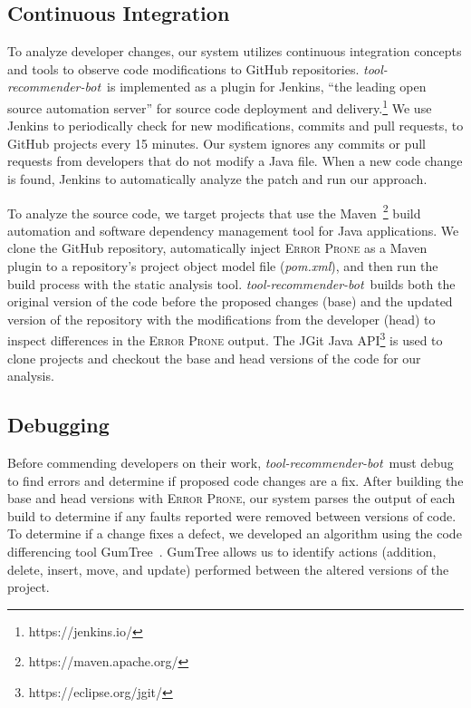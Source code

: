 \documentclass[sigconf,review,anonymous]{acmart}
\newcommand{\tool}{\textsl{tool-recommender-bot}}
\begin{document}
\subsection{Continuous Integration}

To analyze developer changes, our system utilizes continuous integration concepts and tools to observe code modifications to GitHub repositories. \tool~is implemented as a plugin for Jenkins, ``the leading open source automation server'' for source code deployment and delivery.\footnote{https://jenkins.io/} We use Jenkins to periodically check for new modifications, commits and pull requests, to GitHub projects every 15 minutes. Our system ignores any commits or pull requests from developers that do not modify a Java file.
When a new code change is found, Jenkins to automatically analyze the patch and run our approach. 

To analyze the source code, we target projects that use the Maven~\footnote{https://maven.apache.org/} build automation and software dependency management tool for Java applications. We clone the GitHub repository, automatically inject \textsc{Error Prone} as a Maven plugin to a repository's project object model file (\textit{pom.xml}), and then run the build process with the static analysis tool. \tool~builds both the original version of the code before the proposed changes (base) and the updated version of the repository with the modifications from the developer (head) to inspect differences in the \textsc{Error Prone} output. The JGit Java API\footnote{https://eclipse.org/jgit/} is used to clone projects and checkout the base and head versions of the code for our analysis.

\subsection{Debugging}

Before commending developers on their work, \tool~must debug to find errors and determine if proposed code changes are a fix. After building the base and head versions with \textsc{Error Prone}, our system parses the output of each build to determine if any faults reported were removed between versions of code. To determine if a change fixes a defect, we developed an algorithm using the code differencing tool GumTree~\cite{GumTree}. GumTree allows us to identify actions (addition, delete, insert, move, and update) performed between the altered versions of the project. 
\end{document}
